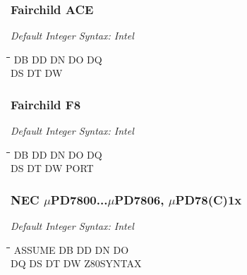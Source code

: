 \subsubsection{Fairchild ACE}

{\em Default Integer Syntax: Intel}

{\tt\begin{tabbing}
\hspace{3cm}\=\hspace{3cm}\=\hspace{3cm}\=\hspace{3cm}\=\kill
DB          \> DD          \> DN        \> DO           \> DQ \\
DS          \> DT          \> DW \\
\end{tabbing}}

\subsubsection{Fairchild F8}

{\em Default Integer Syntax: Intel}

{\tt\begin{tabbing}
\hspace{3cm}\=\hspace{3cm}\=\hspace{3cm}\=\hspace{3cm}\=\kill
DB          \> DD          \> DN        \> DO           \> DQ \\
DS          \> DT          \> DW        \> PORT \\
\end{tabbing}}

\subsubsection{NEC $\mu$PD7800...$\mu$PD7806, $\mu$PD78(C)1x}

{\em Default Integer Syntax: Intel}

{\tt\begin{tabbing}
\hspace{3cm}\=\hspace{3cm}\=\hspace{3cm}\=\hspace{3cm}\=\kill
ASSUME     \> DB          \> DD          \> DN          \> DO \\
DQ         \> DS          \> DT          \> DW          \> Z80SYNTAX \\
\end{tabbing}}


